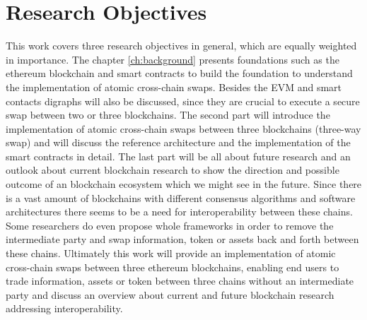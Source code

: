 \section{Research Objectives}
\label{sec:intro:goal}
This work covers three research objectives in general, which are equally weighted in importance. The chapter \ref{ch:background} presents foundations such as the ethereum blockchain and smart contracts to build the foundation to understand the implementation of atomic cross-chain swaps. Besides the \ac{EVM} and smart contacts digraphs will also be discussed, since they are crucial to execute a secure swap between two or three blockchains. The second part will introduce the implementation of atomic cross-chain swaps between three blockchains (three-way swap) and will discuss the reference architecture and the implementation of the smart contracts in detail. The last part will be all about future research and an outlook about current blockchain research to show the direction and possible outcome of an blockchain ecosystem which we might see in the future. Since there is a vast amount of blockchains with different consensus algorithms and software architectures there seems to be a need for interoperability between these chains. Some researchers do even propose whole frameworks in order to remove the intermediate party and swap information, token or assets back and forth between these chains. Ultimately this work will provide an implementation of atomic cross-chain swaps between three ethereum blockchains, enabling end users to trade information, assets or token between three chains without an intermediate party and discuss an overview about current and future blockchain research addressing interoperability.


%
%
